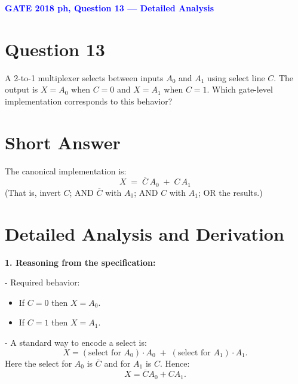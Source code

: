 \documentclass[a4paper,12pt]{article}
\begin{document}
\thispagestyle{fancy}
\fancyhf{}
\renewcommand{\headrulewidth}{0pt}
\fancyfoot[C]{\thepage}
\vspace*{1cm}

\begin{center}
    {\LARGE \textbf{\textcolor{blue}{GATE 2018 ph, Question 13 --- Detailed Analysis}}}
\end{center}

\section*{\textbf{Question 13}}
A 2-to-1 multiplexer selects between inputs \(A_0\) and \(A_1\) using select line \(C\). The output is \(X = A_0\) when \(C=0\) and \(X = A_1\) when \(C=1\). Which gate-level implementation corresponds to this behavior?

\section*{\textbf{Short Answer}}
The canonical implementation is:
\[
\boxed{\,X \;=\; \overline{C}\,A_0 \;+\; C\,A_1\,}
\]
(That is, invert \(C\); AND \(\overline{C}\) with \(A_0\); AND \(C\) with \(A_1\); OR the results.)

\section*{\textbf{Detailed Analysis and Derivation}}

\textbf{1. Reasoning from the specification:}

- Required behavior:
  \begin{itemize}
    \item If \(C = 0\) then \(X = A_0\).
    \item If \(C = 1\) then \(X = A_1\).
  \end{itemize}

- A standard way to encode a select is:
  \[
  X = (\text{select for }A_0)\cdot A_0 \;+\; (\text{select for }A_1)\cdot A_1.
  \]
  Here the select for \(A_0\) is \(\overline{C}\) and for \(A_1\) is \(C\). Hence:
  \[
  X = \overline{C}A_0 + C A_1.
  \]
\end{document}
